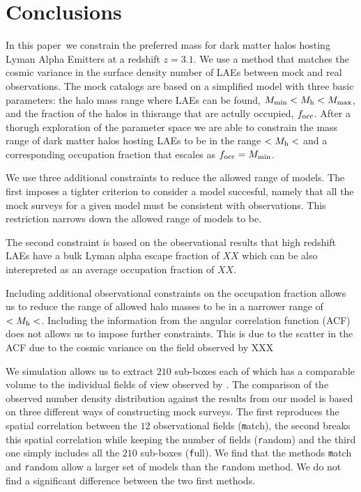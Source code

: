 \documentclass[usenatbib]{mn2e}
\newcommand{\documentname}{paper~}
\begin{document}
\section{Conclusions}
In this \documentname we constrain the preferred mass for dark matter
halos hosting Lyman Alpha Emitters at a redshift $z=3.1$. We use a
method that matches the cosmic variance in the surface
density number of LAEs between mock and real observations. The mock
catalogs are based on a simplified model with three basic parameters: the halo
mass range where LAEs can be found, $M_{\rm   min}<M_{\rm h}<M_{\rm
  max}$, and the fraction of the halos in thisrange that are actully
occupied, $f_{\rm occ}$. After a thorugh exploration of the parameter
space we are able to constrain the mass range of dark matter halos
hosting LAEs to be in the range $<M_{\rm   h}<$ and a corresponding
occupation fraction that escales as $f_{\rm   occ} = M_{\rm min}$. 

We use three additional constraints to reduce the allowed
range of models. The first imposes a tighter criterion to consider a
model succesful, namely that all the mock surveys for a given model
must be consistent with observations. This restriction narrows down
the allowed range of models to be. 

The second constraint is based on the observational results that high
redshift LAEs have a bulk Lyman alpha escape fraction of $XX$ which
can be also interepreted as an average occupation fraction of $XX$.

Including additional observational constraints on the occupation
fraction allows us to reduce the range of allowed halo masses to be in
a narrower range of $<M_{\rm h}<$. Including the information from the
angular correlation function (ACF) does not allows us to impose
further constraints. This is due to the scatter in the ACF due to the
cosmic variance on the field observed by XXX


We simulation allows us to extract $210$ sub-boxes each of which has a
comparable volume to the individual fields of view observed by
\cite{Yamada2012}. The comparison of the observed number density
distribution against the results from our model is based on three
different ways of constructing mock surveys. The first reproduces the
spatial correlation between the $12$ observational fields ({\texttt
  match}), the second breaks this spatial correlation while keeping
the number of fields ({\texttt random}) and the third one simply
includes all the $210$ sub-boxes ({\texttt full}). We find that the
methods {\texttt match} and {\texttt random} allow a larger set of
models than the {{\texttt random}} method. We do not find a
significant difference between the two first methods. 
\end{document}
